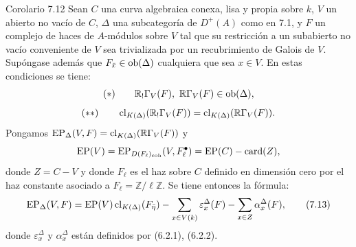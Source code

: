 \begin{statement}{Corolario 7.12}
Sean $C$ una curva algebraica conexa, lisa y propia sobre $k$, $V$ un abierto no vacío de $C$, $\Delta$ una subcategoría de $D^+(A)$ como en 7.1, y $F$ un complejo de haces de $A$-módulos sobre $V$ tal que su restricción a un subabierto no vacío conveniente de $V$ sea trivializada por un recubrimiento de Galois de $V$. Supóngase además que $F_{\bar x}\in\operatorname{ob}(\Delta)$ cualquiera que sea $x\in V$. En estas condiciones se tiene:
\[
(*)\qquad \mathbb{R}_!\Gamma_V(F),\ \mathbb{R}\Gamma_V(F)\in\operatorname{ob}(\Delta),
\]
\[
(**)\qquad
\operatorname{cl}_{K(\Delta)}(\mathbb{R}_!\Gamma_V(F))=\operatorname{cl}_{K(\Delta)}(\mathbb{R}\Gamma_V(F)).
\]
Pongamos $\operatorname{EP}_\Delta(V,F)=\operatorname{cl}_{K(\Delta)}(\mathbb{R}\Gamma_V(F))$ y
\[
\operatorname{EP}(V)=\operatorname{EP}_{D(F_\ell)_{\mathrm{coh}}}(V,F_\ell^\bullet)=\operatorname{EP}(C)-\operatorname{card}(Z),
\]
donde $Z=C-V$ y donde $F_\ell$ es el haz sobre $C$ definido en dimensión cero por el haz constante asociado a $F_\ell=\mathbb Z/\ell\mathbb Z$. Se tiene entonces la fórmula:
\[
\operatorname{EP}_\Delta(V,F)
=
\operatorname{EP}(V)\operatorname{cl}_{K(\Delta)}(F_{\bar\eta})
-\sum_{x\in V(k)}\varepsilon_x^\Delta(F)
-\sum_{x\in Z}\alpha_x^\Delta(F),
\tag{7.13}
\]
donde $\varepsilon_x^\Delta$ y $\alpha_x^\Delta$ están definidos por (6.2.1), (6.2.2).
\end{statement}
